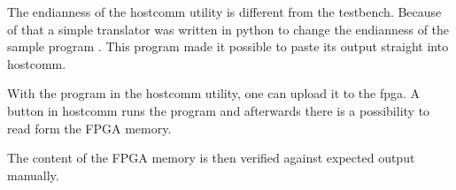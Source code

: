 The endianness of the hostcomm utility \cite{hostcomm} is different from the testbench.
Because of that a simple translator was written in python to change
the endianness of the sample program \cite{endian-change}.
This program made it possible to paste its output straight into hostcomm.

With the program in the hostcomm utility, one can upload it to the fpga.
A button in hostcomm runs the program and afterwards there is a possibility to read form the FPGA memory.

The content of the FPGA memory is then verified against expected output manually.

\begin{figure}[ht!]
    \begin{center}
        \\ %
\end{center}
\end{figure}
